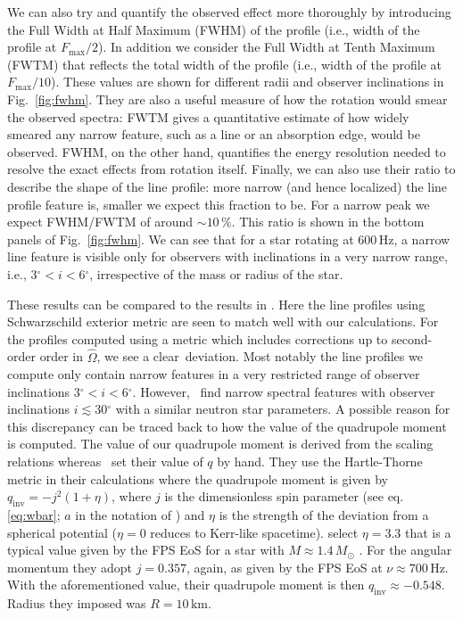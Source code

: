 \documentclass{aa}
\newcommand{\refe}[1]{#1}
\newcommand{\sch}{Schwarzschild }
\newcommand{\Ob}{\ensuremath{\hat{\Omega}}}
\newcommand{\Msun}{\ensuremath{M_{\odot}}}
\newcommand{\qinv}{\ensuremath{q_{\mathrm{inv}}}}
\renewcommand{\deg}{\ensuremath{^{\circ}}}
\begin{document}
We can also try and quantify the observed effect more thoroughly by introducing the Full Width at Half Maximum (FWHM) of the profile (i.e., width of the profile at $F_{\mathrm{max}}/2$).
In addition we consider the Full Width at Tenth Maximum (FWTM) that reflects the total width of the profile (i.e., width of the profile at $F_{\mathrm{max}}/10$).
These values are shown for different radii and observer inclinations in Fig.~\ref{fig:fwhm}.
They are also a useful measure of how the rotation would smear the observed spectra:
FWTM gives a quantitative estimate of how widely smeared any narrow feature, such as a line or an absorption edge, would be observed.
FWHM, on the other hand, quantifies the energy resolution needed to resolve the exact effects from rotation itself.
Finally, we can also use their ratio to describe the shape of the line profile:
more narrow (and hence localized) the line profile feature is, smaller we expect this fraction to be.
For a narrow peak we expect \refe{FWHM/FWTM} of around $\sim 10\,\%$.
This ratio is shown in the bottom panels of Fig.~\ref{fig:fwhm}.
\refe{We can see that for a star rotating at $600\,\mathrm{Hz}$, a narrow line feature is visible only for observers with inclinations in a very narrow range, i.e., $3\deg  < i < 6\deg$, irrespective of the mass or radius of the star.}


These results can be compared to the results in \citet{BPO13}. 
\refe{Here the line profiles using \sch exterior metric are seen to match well with our calculations.}
\refe{For the profiles computed using a metric which includes corrections up to second-order order in $\Ob$, we see a clear deviation.}
\refe{Most notably the line profiles we compute only contain narrow features in a very restricted range of observer inclinations $3\deg  < i < 6\deg$. }
\refe{However, \citet{BPO13} find narrow spectral features with observer inclinations $i \lesssim 30\deg$ with a similar neutron star parameters.}
\refe{A possible reason for this discrepancy can be traced back to how the value of the quadrupole moment is computed.}
\refe{The value of our quadrupole moment is derived from the scaling relations whereas \citet{BPO13} set their value of $q$ by hand.}
\refe{They use the Hartle-Thorne metric \citep{HT68} in their calculations where} the quadrupole moment is given by $\qinv = -j^2 (1 + \eta)$, where $j$ is the dimensionless spin parameter (see eq. \eqref{eq:wbar}; $a$ in the notation of \citealt{BPO13}) and $\eta$ is the strength of the deviation from a spherical potential ($\eta = 0$ reduces to Kerr-like spacetime).
\citet{BPO13} select $\eta=3.3$ that is a typical value given by the FPS EoS \citep{FPS} for a star with $M\approx1.4\,\Msun$ \citep[see][]{LP99}.
For the angular momentum they adopt $j = 0.357$, again, as given by the FPS EoS at $\nu \approx 700\,\mathrm{Hz}$.
With the aforementioned value, their quadrupole moment is then $\qinv \approx -0.548$.
Radius they imposed was $R = 10\,\mathrm{km}$.
\end{document}
